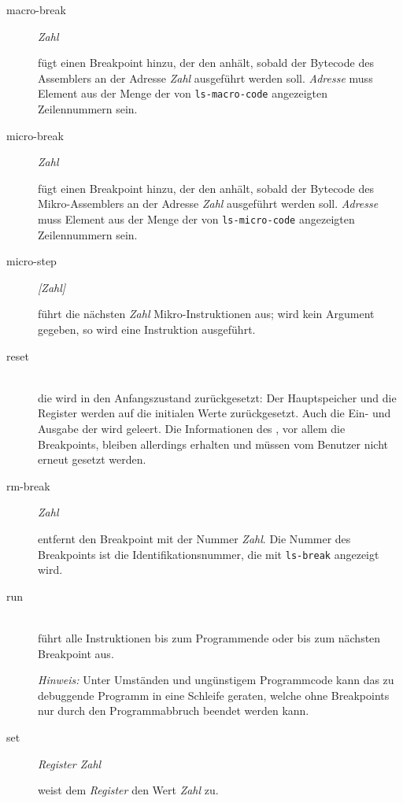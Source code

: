 \begin{description}
\item[macro-break] \emph{Zahl}

  fügt einen Breakpoint hinzu, der den \md anhält, sobald der Bytecode des Assemblers an der Adresse \emph{Zahl} ausgeführt werden soll. \emph{Adresse} muss Element aus der Menge der von \texttt{ls-macro-code} angezeigten Zeilennummern sein.

\item[micro-break] \emph{Zahl}

  fügt einen Breakpoint hinzu, der den \md anhält, sobald der Bytecode des Mikro-Assemblers an der Adresse \emph{Zahl} ausgeführt werden soll. \emph{Adresse} muss Element aus der Menge der von \texttt{ls-micro-code} angezeigten Zeilennummern sein.

\item[micro-step] \emph{[Zahl]}

  führt die nächsten \emph{Zahl} Mikro-Instruktionen aus; wird kein Argument gegeben, so wird eine Instruktion ausgeführt.

\item[reset] \hspace*{\fill}\\

  die \mic wird in den Anfangszustand zurückgesetzt: Der Hauptspeicher und die Register werden auf die initialen Werte zurückgesetzt. Auch die Ein- und Ausgabe der \mic wird geleert. Die Informationen des \md, vor allem die Breakpoints, bleiben allerdings erhalten und müssen vom Benutzer nicht erneut gesetzt werden.

\item[rm-break] \emph{Zahl}

  entfernt den Breakpoint mit der Nummer \emph{Zahl}. Die Nummer des Breakpoints ist die Identifikationsnummer, die mit \texttt{ls-break} angezeigt wird.

\item[run] \hspace*{\fill}\\
  
  führt alle Instruktionen bis zum Programmende oder bis zum nächsten Breakpoint aus.

  \emph{Hinweis:} Unter Umständen und ungünstigem Programmcode kann das zu debuggende Programm in eine Schleife geraten, welche ohne Breakpoints nur durch den Programmabbruch beendet werden kann.

\item[set] \emph{Register Zahl}

  weist dem \emph{Register} den Wert \emph{Zahl} zu.


\end{description}

